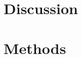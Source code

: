 \documentclass[12pt]{article}
\begin{document}
\section*{Discussion}

\section*{Methods}



\end{document}
